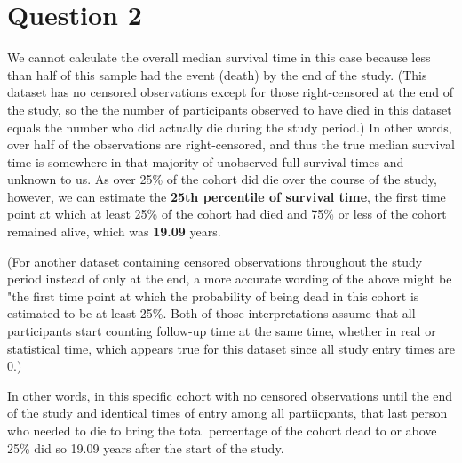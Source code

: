 \documentclass{article}\usepackage[]{graphicx}\usepackage[]{color}
\newif\ifdraft  %
\begin{document}
\pagebreak

\section*{Question 2}

\ifdraft

\textbf{Referring to the code from lecture}, are you able to calculate the overall median survival time in this case? If so, provide an estimate of this quantity, if not, describe why and provide an estimate of a percentile of survival time (of your choice). Interpret the quantity that you estimated. \textbf{(20 points)}

\vspace{2mm}



\fi

We cannot calculate the overall median survival time in this case because less than half of this sample had the event (death) by the end of the study.  (This dataset has no censored observations except for those right-censored at the end of the study, so the the number of participants observed to have died in this dataset equals the number who did actually die during the study period.)  In other words, over half of the observations are right-censored, and thus the true median survival time is somewhere in that majority of unobserved full survival times and unknown to us.  As over 25\% of the cohort did die over the course of the study, however, we can estimate the \textbf{25th percentile of survival time}, the first time point at which at least 25\% of the cohort had died and 75\% or less of the cohort remained alive, which was \textbf{19.09} years.  

\vspace{2mm}

(For another dataset containing censored observations throughout the study period instead of only at the end, a more accurate wording of the above might be "the first time point at which the probability of being dead in this cohort is estimated to be at least 25\%.  Both of those interpretations assume that all participants start counting follow-up time at the same time, whether in real or statistical time, which appears true for this dataset since all study entry times are 0.)

\vspace{2mm}

In other words, in this specific cohort with no censored observations until the end of the study and identical times of entry among all partiicpants, that last person who needed to die to bring the total percentage of the cohort dead to or above 25\% did so 19.09 years after the start of the study.
\end{document}
